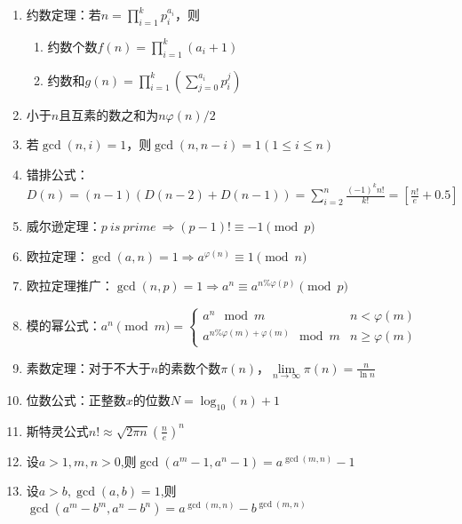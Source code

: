 \begin{enumerate}
    \item 约数定理：若$n=\prod_{i=1}^kp_i^{a_i}$，则
    
    \begin{enumerate}
    \item 约数个数$f(n)=\prod_{i=1}^k(a_i+1)$
    \item 约数和$g(n)=\prod_{i=1}^k(\sum_{j=0}^{a_i}p_i^j)$
    \end{enumerate}
    
    \item 小于$n$且互素的数之和为$n\varphi(n)/2$
    
    \item 若$\gcd(n,i)=1$，则$\gcd(n,n-i)=1(1\leq i\leq n)$
    
    \item 错排公式：$D(n)=(n-1)(D(n-2)+D(n-1))=\sum_{i=2}^n\frac{(-1)^kn!}{k!}=[\frac{n!}{e}+0.5]$
    
    \item 威尔逊定理：$p\ is\ prime\ \Rightarrow (p-1)!\equiv-1\pmod p$
    
    \item 欧拉定理：$\gcd(a,n)=1\Rightarrow a^{\varphi(n)}\equiv1\pmod n$
    
    \item 欧拉定理推广：$\gcd(n,p)=1\Rightarrow a^n\equiv a^{n\%\varphi(p)}\pmod p$
    
    \item 模的幂公式：$a ^ n \pmod {m} = 
    \begin{cases}
    a ^ n \mod m & n < \varphi(m)\\
    a ^ {n \% \varphi(m) + \varphi(m)} \mod m & n \ge \varphi(m)
    \end{cases}
    $
    
    \item 素数定理：对于不大于$n$的素数个数$\pi(n)$，$\lim\limits_{n\to\infty}\pi(n)=\frac{n}{\ln n}$
    
    \item 位数公式：正整数$x$的位数$N=\log_{10}(n)+1$
    
    \item 斯特灵公式$n!\approx\sqrt{2\pi n}(\frac{n}{e})^n$
    
    \item 设$a>1,m,n>0$,则$\gcd(a^m-1,a^n-1)=a^{\gcd(m,n)}-1$
    
    \item 设$a>b,\gcd(a,b)=1$,则$\gcd(a^m-b^m,a^n-b^n)=a^{\gcd(m,n)}-b^{\gcd(m,n)}$
    

\end{enumerate}
